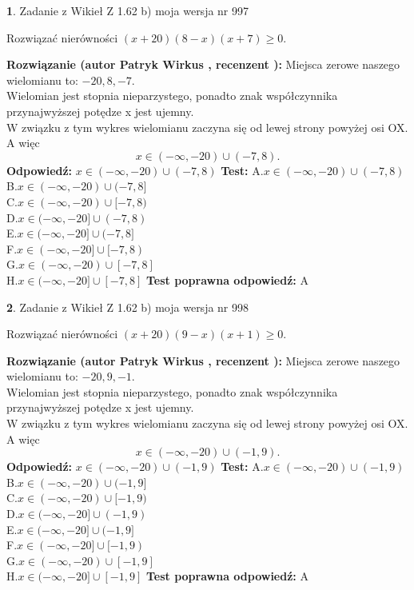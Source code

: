 \documentclass[12pt, a4paper]{article}
\theoremstyle{definition} %
\newtheorem{zad}{}
\newcommand{\zadStart}[1]{\begin{zad}#1\newline}
\newcommand{\zadStop}{\end{zad}}
\newcommand{\rozwStart}[2]{\noindent \textbf{Rozwiązanie (autor #1 , recenzent #2): }\newline}
\newcommand{\rozwStop}{\newline}
\newcommand{\odpStart}{\noindent \textbf{Odpowiedź:}\newline}
\newcommand{\odpStop}{\newline}
\newcommand{\testStart}{\noindent \textbf{Test:}\newline}
\newcommand{\testStop}{\newline}
\newcommand{\kluczStart}{\noindent \textbf{Test poprawna odpowiedź:}\newline}
\newcommand{\kluczStop}{\newline}
\begin{document}
\zadStart{Zadanie z Wikieł Z 1.62 b) moja wersja nr 997}

Rozwiązać nierówności $(x+20)(8-x)(x+7)\ge0$.
\zadStop
\rozwStart{Patryk Wirkus}{}
Miejsca zerowe naszego wielomianu to: $-20, 8, -7$.\\
Wielomian jest stopnia nieparzystego, ponadto znak współczynnika przy\linebreak najwyższej potędze x jest ujemny.\\ W związku z tym wykres wielomianu zaczyna się od lewej strony powyżej osi OX. A więc $$x \in (-\infty,-20) \cup (-7,8).$$
\rozwStop
\odpStart
$x \in (-\infty,-20) \cup (-7,8)$
\odpStop
\testStart
A.$x \in (-\infty,-20) \cup (-7,8)$\\
B.$x \in (-\infty,-20) \cup (-7,8]$\\
C.$x \in (-\infty,-20) \cup [-7,8)$\\
D.$x \in (-\infty,-20] \cup (-7,8)$\\
E.$x \in (-\infty,-20] \cup (-7,8]$\\
F.$x \in (-\infty,-20] \cup [-7,8)$\\
G.$x \in (-\infty,-20) \cup [-7,8]$\\
H.$x \in (-\infty,-20] \cup [-7,8]$
\testStop
\kluczStart
A
\kluczStop



\zadStart{Zadanie z Wikieł Z 1.62 b) moja wersja nr 998}

Rozwiązać nierówności $(x+20)(9-x)(x+1)\ge0$.
\zadStop
\rozwStart{Patryk Wirkus}{}
Miejsca zerowe naszego wielomianu to: $-20, 9, -1$.\\
Wielomian jest stopnia nieparzystego, ponadto znak współczynnika przy\linebreak najwyższej potędze x jest ujemny.\\ W związku z tym wykres wielomianu zaczyna się od lewej strony powyżej osi OX. A więc $$x \in (-\infty,-20) \cup (-1,9).$$
\rozwStop
\odpStart
$x \in (-\infty,-20) \cup (-1,9)$
\odpStop
\testStart
A.$x \in (-\infty,-20) \cup (-1,9)$\\
B.$x \in (-\infty,-20) \cup (-1,9]$\\
C.$x \in (-\infty,-20) \cup [-1,9)$\\
D.$x \in (-\infty,-20] \cup (-1,9)$\\
E.$x \in (-\infty,-20] \cup (-1,9]$\\
F.$x \in (-\infty,-20] \cup [-1,9)$\\
G.$x \in (-\infty,-20) \cup [-1,9]$\\
H.$x \in (-\infty,-20] \cup [-1,9]$
\testStop
\kluczStart
A
\kluczStop
\end{document}
